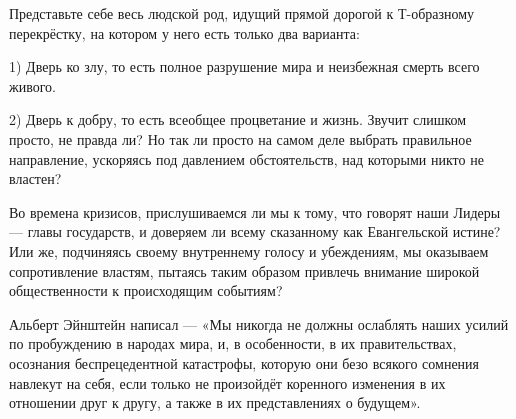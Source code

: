 \documentclass[a4paper,12pt]{book}
\begin{document}
Представьте себе весь людской род, идущий прямой дорогой к Т-образному перекрёстку, на котором у него есть только два варианта:
\par
1) Дверь ко злу, то есть полное разрушение мира и неизбежная смерть всего живого.
\par
2) Дверь к добру, то есть всеобщее процветание и жизнь.
Звучит слишком просто, не правда ли? Но так ли просто на самом деле выбрать правильное направление, ускоряясь под давлением обстоятельств, над которыми никто не властен?\\
\par
Во времена кризисов, прислушиваемся ли мы к тому, что говорят наши Лидеры — главы государств, и доверяем ли всему сказанному как Евангельской истине? Или же, подчиняясь своему внутреннему голосу и убеждениям, мы оказываем сопротивление властям, пытаясь таким образом привлечь внимание широкой общественности к происходящим событиям?\\
\par
Альберт Эйнштейн написал — «Мы никогда не должны ослаблять наших усилий по пробуждению в народах мира, и, в особенности, в их правительствах, осознания беспрецедентной катастрофы, которую они безо всякого сомнения навлекут на себя, если только не произойдёт коренного изменения в их отношении друг к другу, а также в их представлениях о будущем».
\end{document}

